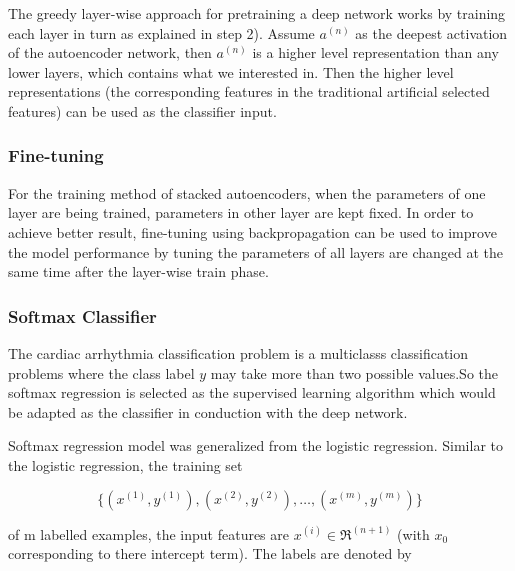 \documentclass[journal]{IEEEtran}
\begin{document}
The greedy layer-wise approach for pretraining a deep network works by training each layer in turn as explained in step 2). Assume $a^{(n)}$ as the deepest activation of the autoencoder network, then $a^{(n)}$ is a higher level representation than any lower layers, which contains what we interested in. Then the higher level representations (the corresponding features in the traditional artificial selected features) can be used as the classifier input.

\subsubsection{Fine-tuning}
For the training method of stacked autoencoders, when the parameters of one layer are being trained, parameters in other layer are kept fixed. In order to achieve better result, fine-tuning using backpropagation can be used to improve the model performance by tuning the parameters of all layers are changed at the same time after the layer-wise train phase.

\subsubsection{Softmax Classifier}

The cardiac arrhythmia classification problem is a multiclasss classification problems where the class label $y$ may take more than two possible values.So the softmax regression is selected as the supervised learning algorithm which would be adapted as the classifier in conduction with the deep network.

Softmax regression model was generalized  from the logistic regression. Similar to the logistic regression, the training set

\begin{equation}
\{(x^{(1)},y^{(1)}), (x^{(2)},y^{(2)}), \ldots, (x^{(m)},y^{(m)}) \}
\end{equation}

\noindent of m labelled examples, the input features are $x^{(i)} \in \Re^{(n+1)}$ (with $x_0$ corresponding to there intercept term). The labels are denoted by 
\end{document}
